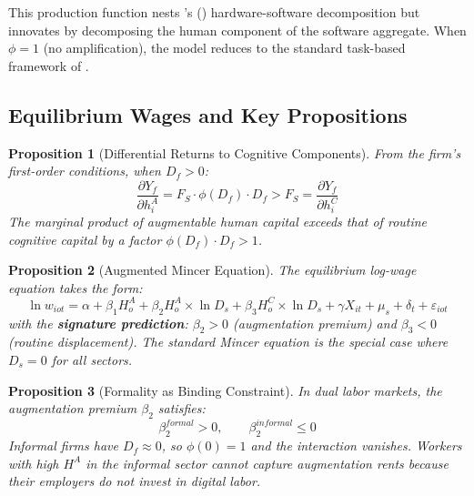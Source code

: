 \documentclass[11pt,a4paper]{article}
\newtheorem{proposition}{Proposition}
\theoremstyle{definition}
\begin{document}
This production function nests \citeauthor{growiec2024hardware}'s (\citeyear{growiec2024hardware}) hardware-software decomposition but innovates by decomposing the human component of the software aggregate. When $\phi = 1$ (no amplification), the model reduces to the standard task-based framework of \citet{acemoglu2018race}.

\subsection{Equilibrium Wages and Key Propositions}

\begin{proposition}[Differential Returns to Cognitive Components]
\label{prop:returns}
From the firm's first-order conditions, when $D_f > 0$:
\begin{equation}
\frac{\partial Y_f}{\partial h_i^A} = F_S \cdot \phi(D_f) \cdot D_f > F_S = \frac{\partial Y_f}{\partial h_i^C}
\end{equation}
The marginal product of augmentable human capital exceeds that of routine cognitive capital by a factor $\phi(D_f) \cdot D_f > 1$.
\end{proposition}

\begin{proposition}[Augmented Mincer Equation]
\label{prop:mincer}
The equilibrium log-wage equation takes the form:
\begin{equation}
\ln w_{iot} = \alpha + \beta_1 H_o^A + \beta_2 H_o^A \times \ln D_{s} + \beta_3 H_o^C \times \ln D_{s} + \gamma X_{it} + \mu_s + \delta_t + \varepsilon_{iot}
\label{eq:mincer}
\end{equation}
with the \textbf{signature prediction}: $\beta_2 > 0$ (augmentation premium) and $\beta_3 < 0$ (routine displacement). The standard Mincer equation is the special case where $D_s = 0$ for all sectors.
\end{proposition}

\begin{proposition}[Formality as Binding Constraint]
\label{prop:formality}
In dual labor markets, the augmentation premium $\beta_2$ satisfies:
\begin{equation}
\beta_2^{formal} > 0, \qquad \beta_2^{informal} \leq 0
\end{equation}
Informal firms have $D_f \approx 0$, so $\phi(0) = 1$ and the interaction vanishes. Workers with high $H^A$ in the informal sector cannot capture augmentation rents because their employers do not invest in digital labor.
\end{proposition}
\end{document}
